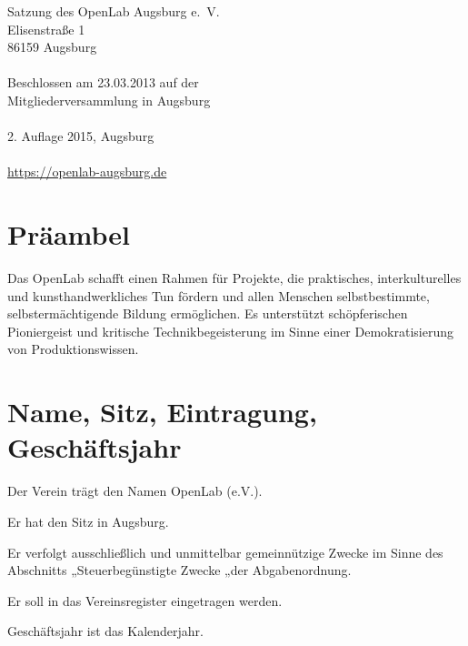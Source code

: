 \documentclass[a5paper, ngerman, 10pt]{scrreprt}
\begin{document}


\thispagestyle{empty}
\vspace*{\fill}
\begin{footnotesize}
    \begin{singlespace}
        \noindent Satzung des OpenLab Augsburg e.~V.\\
        Elisenstraße 1\\
        86159 Augsburg\\
        \\
        Beschlossen am 23.03.2013 auf der\\
        Mitgliederversammlung in Augsburg\\
        \\
        2. Auflage 2015, Augsburg\\
        \\
        \url{https://openlab-augsburg.de}
    \end{singlespace}
\end{footnotesize}
\clearpage

\tableofcontents
\clearpage


\section*{Präambel}
Das OpenLab schafft einen Rahmen für Projekte, die praktisches,
interkulturelles und kunsthandwerkliches Tun fördern und allen Menschen
selbstbestimmte, selbstermächtigende Bildung ermöglichen. Es unterstützt
schöpferischen Pioniergeist und kritische Technikbegeisterung im Sinne einer
Demokratisierung von Produktionswissen.


\section{Name, Sitz, Eintragung, Geschäftsjahr}
\begin{compactenum}[(1)]
    \item Der Verein trägt den Namen OpenLab (e.V.).
    \item Er hat den Sitz in Augsburg.
    \item Er verfolgt ausschließlich und unmittelbar gemeinnützige Zwecke im
        Sinne des Abschnitts „Steuerbegünstigte Zwecke „der Abgabenordnung.
    \item Er soll in das Vereinsregister eingetragen werden.
    \item Geschäftsjahr ist das Kalenderjahr.
\end{compactenum}
\end{document}
